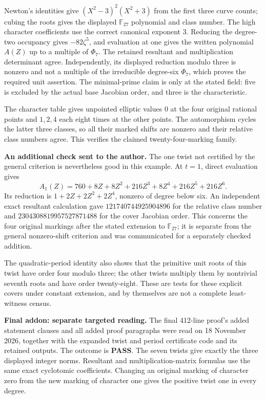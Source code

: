 Newton's identities give
$(X^2-3)^2(X^2+3)$ from the first three curve
counts; cubing the roots gives the displayed
$\mathbb F_{27}$ polynomial and class number.
The high character coefficients use the correct
canonical exponent $3$.  Reducing the degree-two
occupancy gives $-82\zeta^5$, and evaluation at
one gives the written polynomial $A(Z)$ up to a
multiple of $\Phi_7$.  The retained resultant and
multiplication determinant agree.  Independently,
its displayed reduction modulo three is nonzero
and not a multiple of the irreducible degree-six
$\Phi_7$, which proves the required unit assertion.
The minimal-prime claim is only at the stated
field: five is excluded by the actual base
Jacobian order, and three is the characteristic.

The character table gives unpointed elliptic values
$0$ at the four original rational points and
$1,2,4$ each eight times at the other points.
The automorphism cycles the latter three classes,
so all their marked shifts are nonzero and their
relative class numbers agree.  This verifies the
claimed twenty-four-marking family.

\medskip\noindent\textbf{An additional check sent to the author.}
The one twist not certified by the general
criterion is nevertheless good in this example.
At $t=1$, direct evaluation gives
\[
 A_1(Z)=760+8Z+8Z^2+216Z^3+8Z^4+216Z^5+216Z^6.
\]
Its reduction is $1+2Z+2Z^2+2Z^4$, nonzero of
degree below six.  An independent exact resultant
calculation gave
$121740744925904896$ for the relative class number
and $2304308819957527871488$ for the cover Jacobian
order.  This concerns the four original markings
after the stated extension to $\mathbb F_{27}$;
it is separate from the general nonzero-shift
criterion and was communicated for a separately
checked addition.

The quadratic-period identity also shows that
the primitive unit roots of this twist have order
four modulo three; the other twists multiply
them by nontrivial seventh roots and have order
twenty-eight.  These are tests for these explicit
covers under constant extension, and by themselves
are not a complete least-witness census.

\medskip\noindent\textbf{Final addon: separate targeted reading.}
The final 412-line proof's added statement clauses
and all added proof paragraphs were read on
18 November 2026, together with the expanded
twist and period certificate code and its retained
outputs.  The outcome is \textbf{PASS}.
The seven twists give exactly the three displayed
integer norms.  Resultant and multiplication-matrix
formulas use the same exact cyclotomic coefficients.
Changing an original marking of character zero
from the new marking of character one gives the
positive twist one in every degree.

